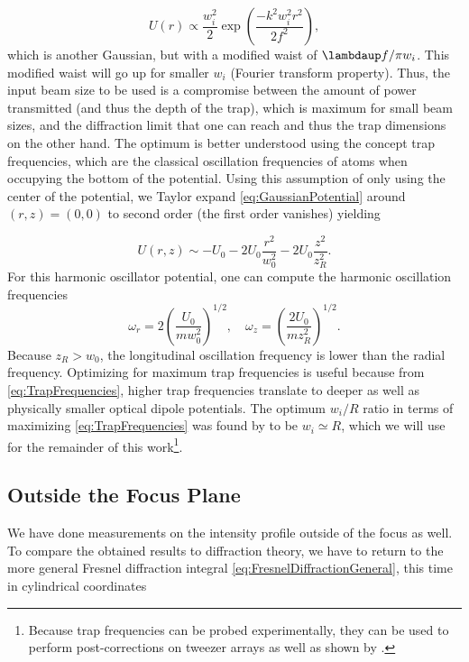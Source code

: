 \begin{equation}\label{eq:GaussianCase}
	U(r) \propto \frac{w_i^2}{2} \exp{\left(\frac{-k^2w_i^2 r^2}{2f^2}\right)},
\end{equation}
which is another Gaussian, but with a modified waist of $\lambdaup f / \pi w_i$.
This modified waist will go up for smaller $w_i$ (Fourier transform property). 
Thus, the input beam size to be used is a compromise between the amount of power transmitted (and thus the depth of the trap), which is maximum for small beam sizes, and the diffraction limit that one can reach and thus the trap dimensions on the other hand. 
The optimum is better understood using the concept trap frequencies, which are the classical oscillation frequencies of atoms when occupying the bottom of the potential. 
Using this assumption of only using the center of the potential, we Taylor expand \cref{eq:GaussianPotential} around $(r,z)=(0,0)$ to second order (the first order vanishes) yielding \cite{Muldoon2012}

\begin{equation}\label{eq:ApproximateGaussianPotential}
	U(r,z) \sim -U_0 - 2U_0 \frac{r^2}{w_0^2} - 2U_0 \frac{z^2}{z_R^2}.
\end{equation}
For this harmonic oscillator potential, one can compute the harmonic oscillation frequencies 
\begin{equation}\label{eq:TrapFrequencies}
	\omega_r = 2\left(\frac{U_0}{m w_0^2}\right)^{1/2}, \quad
	\omega_z= \left(\frac{2 U_0}{m z_R^2}\right)^{1/2}.
\end{equation}
Because $z_R > w_0$, the longitudinal oscillation frequency is lower than the radial frequency. 
Optimizing for maximum trap frequencies is useful because from \cref{eq:TrapFrequencies}, higher trap frequencies translate to deeper as well as physically smaller optical dipole potentials.
The optimum $w_i/R$ ratio in terms of maximizing \cref{eq:TrapFrequencies} was found by \cite{Madjarov2021} to be $w_i\simeq R$, which we will use for the remainder of this work\footnote{Because trap frequencies can be probed experimentally, they can be used to perform post-corrections on tweezer arrays as well as shown by \cite{Ebadi2021}.}.

\subsection{Outside the Focus Plane}

We have done measurements on the intensity profile outside of the focus as well.
To compare the obtained results to diffraction theory, we have to return to the more general Fresnel diffraction integral \cref{eq:FresnelDiffractionGeneral}, this time in cylindrical coordinates \cite{Gu2000}

